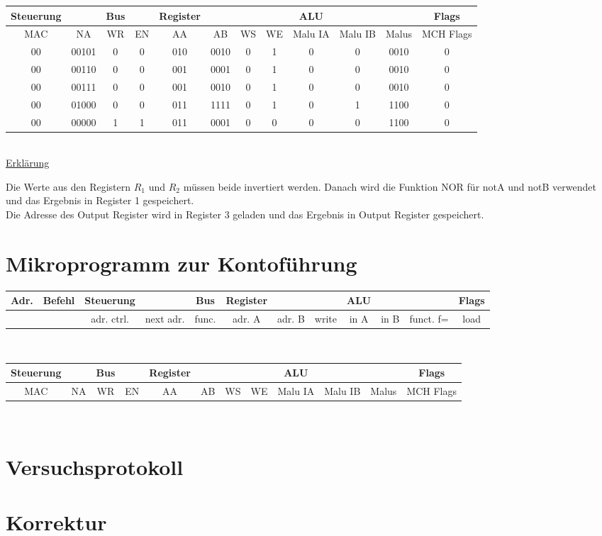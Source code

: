 \documentclass[paper=a4, fontsize=11pt]{scrartcl}
\numberwithin{equation}{section}
\numberwithin{figure}{section}
\numberwithin{table}{section}
\begin{document}
\begin{tabular}{|cc|cc|cccc|ccc|c|}
\hline
Steuerung & & Bus & & Register & & & & ALU & & & Flags \\
\hline
MAC & NA & WR & EN & AA & AB & WS & WE & Malu IA & Malu IB & Malus & MCH Flags \\
\hline
00 & 00101 & 0 & 0 & 010 & 0010 & 0 & 1 & 0 & 0 & 0010 & 0 \\
\hline
00 & 00110 & 0 & 0 & 001 & 0001 & 0 & 1 & 0 & 0 & 0010 & 0 \\
\hline
00 & 00111 & 0 & 0 & 001 & 0010 & 0 & 1 & 0 & 0 & 0010 & 0 \\
\hline
00 & 01000 & 0 & 0 & 011 & 1111 & 0 & 1 & 0 & 1 & 1100 & 0 \\
\hline
00 & 00000 & 1 & 1 & 011 & 0001 & 0 & 0 & 0 & 0 & 1100 & 0 \\
\hline
\end{tabular} \\

\underline{Erklärung}

Die Werte aus den Registern $R_{1}$ und $R_{2}$ müssen beide invertiert werden. Danach wird die Funktion NOR für notA und notB verwendet und das Ergebnis in Register 1 gespeichert. \\
Die Adresse des Output Register wird in Register 3 geladen und das Ergebnis in Output Register gespeichert.


\newpage

\section{Mikroprogramm zur Kontoführung}

\begin{tabular}{|c|c|cc|c|ccc|ccc|c|}
\hline
Adr. & Befehl &Steuerung & & Bus & Register & & & ALU & & & Flags \\
\hline
& & adr. ctrl. & next adr. & func. & adr. A & adr. B & write & in A & in B & funct. f= & load \\
\hline
\end{tabular} \\

\begin{tabular}{|cc|cc|cccc|ccc|c|}
\hline
Steuerung & & Bus & & Register & & & & ALU & & & Flags \\
\hline
MAC & NA & WR & EN & AA & AB & WS & WE & Malu IA & Malu IB & Malus & MCH Flags \\
\hline
\end{tabular} \\


\newpage

\section{Versuchsprotokoll}


\newpage

\section{Korrektur}
\end{document}
